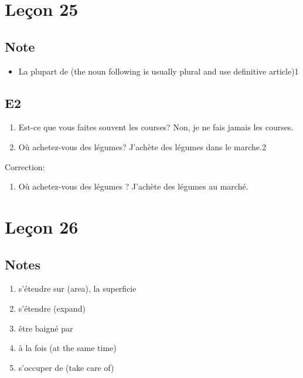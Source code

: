 \documentclass{book}
\begin{document}
\chapter{Leçon 25}
    \section{Note}
        \begin{itemize}
            \item La plupart de (the noun following is usually plural and use definitive article)1
        \end{itemize}

    \section{E2}
        \begin{enumerate}
            \item Est-ce que vous faites souvent les courses? Non, je ne fais jamais les courses.
            \item Où achetez-vous des légumes? J'achète des légumes dans le marche.2
        \end{enumerate}
        Correction:
        \begin{enumerate}
            \item Où achetez-vous des légumes ? J'achète des légumes au marché.
        \end{enumerate}

\chapter{Leçon 26}
    \section{Notes}
        \begin{enumerate}
            \item s'étendre sur (area), la superficie
            \item s'étendre (expand)
            \item être baigné par
            \item à la fois (at the same time)
            \item s'occuper de (take care of)
        \end{enumerate}
\end{document}
